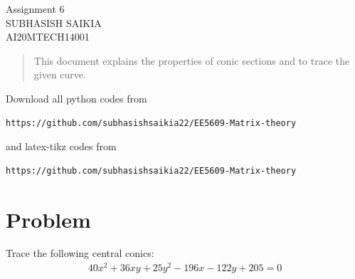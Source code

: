 \documentclass[journal,12pt,twocolumn]{IEEEtran}
\numberwithin{equation}{subsection}
\begin{document}
\begin{center}
\huge Assignment 6\\
\large SUBHASISH SAIKIA\\
\large AI20MTECH14001\\
\end{center}
\vspace{0.5cm}
\begin{abstract}
This document explains the properties of conic sections and to trace the given curve. 
\end{abstract}
\vspace{0.5cm}
Download all python codes from 
\begin{lstlisting}
https://github.com/subhasishsaikia22/EE5609-Matrix-theory
\end{lstlisting}
%
and latex-tikz codes from 
\begin{lstlisting}
https://github.com/subhasishsaikia22/EE5609-Matrix-theory
\end{lstlisting}
%
\vspace{0.5cm}
\section{Problem}
Trace the following central conics:
\begin{align}
   40{x^2}+36{xy}+25{y^2}-196{x}-122{y}+205=0
\end{align}
\end{document}
